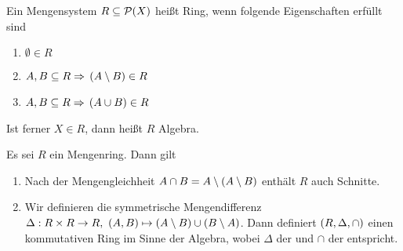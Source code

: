 \begin{bemerkung}
    \marginnote{[28. Okt]}
    Ein Mengensystem $R \subseteq\mathcal{P}\of{X}$ heißt Ring, wenn folgende Eigenschaften erfüllt sind
    \begin{enumerate}[label=($\text{R}_{\arabic*}$)]
        \item $\emptyset\in R$
        \item $A, B\subseteq R \Rightarrow{} \left(A \setminus B\right) \in R$
        \item $A, B\subseteq R \Rightarrow{} \left(A \cup B\right) \in R$
    \end{enumerate}
    Ist ferner $X\in R$, dann heißt $R$ Algebra.
\end{bemerkung}

\begin{bemerkung}
    Es sei $R$ ein Mengenring. Dann gilt
    \begin{enumerate}
        \item Nach der Mengengleichheit $A \cap B = A \setminus \left(A \setminus B\right)$ enthält $R$ auch Schnitte.
        \item Wir definieren die symmetrische Mengendifferenz $\Delta: R \times R \to R,~\left(A, B\right) \mapsto \left(A\setminus B\right) \cup \left(B\setminus A\right)$. Dann definiert $\left(R, \Delta, \cap\right)$ einen kommutativen Ring im Sinne der Algebra, wobei $\Delta$ der  und $\cap$ der  entspricht.
    \end{enumerate}
\end{bemerkung}

\newpage